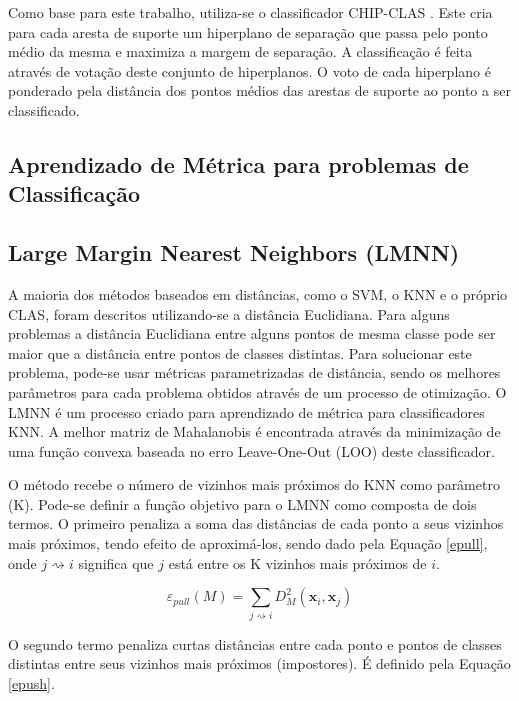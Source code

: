 \documentclass[
	12pt,				%
	openright,			%
	twoside,			%
	a4paper,			%
	english,			%
	spanish,			%
	brazil,				%
	]{abntex2}\usepackage[]{graphicx}\usepackage[]{color}
\begin{document}
Como base para este trabalho, utiliza-se o classificador CHIP-CLAS \cite{Coelho2015}. Este cria para cada aresta de suporte um hiperplano de separação que passa pelo ponto médio da mesma e maximiza a margem de separação. A classificação é feita através de votação deste conjunto de hiperplanos. O voto de cada hiperplano é ponderado pela distância dos pontos médios das arestas de suporte ao ponto a ser classificado. \par

\subsection{Aprendizado de Métrica para problemas de Classificação}

\subsection{Large Margin Nearest Neighbors (LMNN)}

A maioria dos métodos baseados em distâncias, como o SVM, o KNN e o próprio CLAS, foram descritos utilizando-se a distância Euclidiana. Para alguns problemas a distância Euclidiana entre alguns pontos de mesma classe pode ser maior que a distância entre pontos de classes distintas. Para solucionar este problema, pode-se usar métricas parametrizadas de distância, sendo os melhores parâmetros para cada problema obtidos através de um processo de otimização. O LMNN \cite{Weinberger2009} é um processo criado para aprendizado de métrica para classificadores KNN. A melhor matriz de Mahalanobis é encontrada através da minimização de uma função convexa baseada no erro Leave-One-Out (LOO) deste classificador.
\par O método recebe o número de vizinhos mais próximos do KNN como parâmetro (K). Pode-se definir a função objetivo para o LMNN como composta de dois termos. O primeiro penaliza a soma das distâncias de cada ponto a seus vizinhos mais próximos, tendo efeito de aproximá-los, sendo dado pela Equação \ref{epull}, onde $j \rightsquigarrow i$ significa que $j$ está entre os K vizinhos mais próximos de $i$.

\begin{equation}
\varepsilon _{pull}(M) = \sum_{j \rightsquigarrow i}D_{M}^2(\mathbf{x}_i,\mathbf{x}_j)
\label{epull}
\end{equation}

O segundo termo penaliza curtas distâncias entre cada ponto e pontos de classes distintas entre seus vizinhos mais próximos (impostores). É definido pela Equação \ref{epush}.
\end{document}
